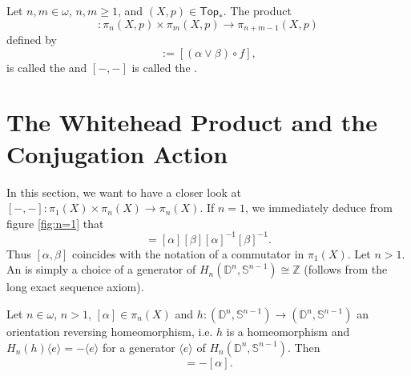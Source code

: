 \begin{definition}
	Let $n,m \in \omega$, $n,m \geq 1$, and $(X,p) \in \mathsf{Top}_\ast$. The product
	\begin{equation*}
		[-,-] : \pi_n(X,p) \times \pi_m(X,p) \to \pi_{n + m - 1}(X,p)
	\end{equation*}
	\noindent defined by
	\begin{equation*}
		[\alpha,\beta] := [(\alpha \vee \beta) \circ f], 
	\end{equation*}
	\noindent is called the  and $[-,-]$ is called the .
\end{definition}

\section{The Whitehead Product and the Conjugation Action}
In this section, we want to have a closer look at $[-,-] : \pi_1(X) \times \pi_n(X) \to \pi_n(X)$. If $n = 1$, we immediately deduce from figure \ref{fig:n=1} that
\begin{equation*}
	[\alpha,\beta] = [\alpha][\beta][\alpha]^{-1}[\beta]^{-1}.
\end{equation*}
Thus $[\alpha,\beta]$ coincides with the notation of a commutator in $\pi_1(X)$. Let $n > 1$. An  is simply a choice of a generator of $H_n(\mathbb{D}^n,\mathbb{S}^{n - 1}) \cong \mathbb{Z}$ (follows from the long exact sequence axiom). 

\begin{lemma}
	\label{lem:order_reversing}
	Let $n \in \omega$, $n > 1$, $[\alpha] \in \pi_n(X)$ and $h : (\mathbb{D}^n,\mathbb{S}^{n - 1}) \to (\mathbb{D}^n,\mathbb{S}^{n - 1})$ an orientation reversing homeomorphism, i.e. $h$ is a homeomorphism and $H_n(h)\langle e \rangle = -\langle e \rangle$ for a generator $\langle e \rangle$ of $H_n(\mathbb{D}^n,\mathbb{S}^{n - 1})$. Then
	\begin{equation*}
		[\alpha \circ h] = -[\alpha].
	\end{equation*}
\end{lemma}


